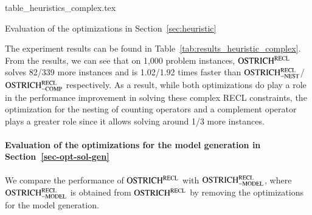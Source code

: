 \begin{table}[htbp]
  {table_heuristics_complex.tex}
  \caption{Evaluation of the optimizations in Section~\ref{sec:heuristic}}\label{tab:results_heuristic_complex}
\end{table}

The experiment results can be found in Table~\ref{tab:results_heuristic_complex}. From the results, we can see that on 1,000 problem instances, $\rm OSTRICH^{RECL}$ solves 82/339 more instances and is 1.02/1.92 times faster than $\rm OSTRICH^{RECL}_{\rm -NEST}$/$\rm OSTRICH^{RECL}_{\rm -COMP}$ respectively. As a result, while both optimizations do play a role in the performance improvement in solving these complex RECL constraints, the optimization for the nesting of counting operators and a complement operator plays a greater role since it allows solving around 1/3 more instances. 



\paragraph*{Evaluation of the optimizations for the model generation in Section~\ref{sec-opt-sol-gen}}

We compare the performance of $\rm OSTRICH^{RECL}$ with $\rm OSTRICH^{RECL}_{\rm -MODEL}$, where $\rm OSTRICH^{RECL}_{\rm -MODEL}$ is obtained from $\rm OSTRICH^{RECL}$ by removing the optimizations for the model generation. 

